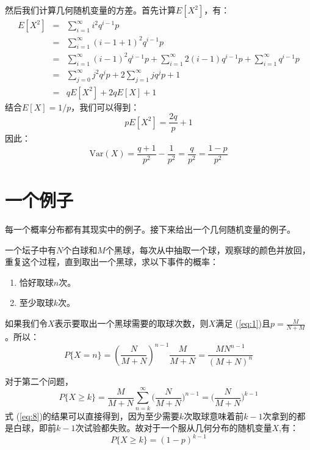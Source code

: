 \documentclass[10pt,a4paper,UTF8]{article}
\begin{document}
然后我们计算几何随机变量的方差。首先计算\(E[X^{2}]\)，有：
\begin{eqnarray}
\label{eq:4}
E[X^{2}]&=& \sum_{i=1}^{\infty} i^{2}q^{i-1}p \\
&=&\sum_{i=1}^{\infty} (i-1+1)^{2}q^{i-1}p \\
&=&\sum_{i=1}^{\infty} (i-1)^{2}q^{i-1}p + \sum_{i=1}^{\infty} 2(i-1)q^{i-1}p + \sum_{i=1}^{\infty}q^{i-1}p \\
&=&\sum_{j=0}^{\infty}j^{2}q^{j}p + 2\sum_{j=1}^{\infty}jq^{j}p + 1 \\
&=&qE[X^{2}] + 2qE[X] +1
\end{eqnarray}
结合\(E[X]=1/p\)，我们可以得到：
\begin{equation}
\label{eq:5}
pE[X^{2}] = \frac{2q}{p} + 1
\end{equation}
因此：
\begin{equation}
\label{eq:6}
\mathrm{Var}(X) = \frac{q+1}{p^{2}} - \frac{1}{p^{2}} = \frac{q}{p^{2}} = \frac{1-p}{p^{2}}
\end{equation}
\section{一个例子}
\label{sec:orgbc3b044}


每一个概率分布都有其现实中的例子。接下来给出一个几何随机变量的例子。

\begin{tikzproblem}
一个坛子中有\(N\)个白球和\(M\)个黑球，每次从中抽取一个球，观察球的颜色并放回，重复这个过程，直到取出一个黑球，求以下事件的概率：
\begin{enumerate}
\item 恰好取球\(n\)次。
\item 至少取球\(k\)次。
\end{enumerate}
\end{tikzproblem}

\begin{tikzanswer}
如果我们令\(X\)表示要取出一个黑球需要的取球次数，则\(X\)满足 (\ref{eq:1})且\(p=\frac{M}{N+M}\)。所以：
\begin{equation}
\label{eq:7}
P\{X=n\} = (\frac{N}{M+N})^{n-1}\frac{M}{M+N} = \frac{MN^{n-1}}{(M+N)^{n}}
\end{equation}

对于第二个问题，
\begin{equation}
\label{eq:8}
P\{X\geq k\} = \frac{M}{M+N}\sum_{n=k}^{\infty} \bigg( \frac{N}{M+N} \bigg)^{n-1} = \bigg( \frac{N}{M+N} \bigg)^{k-1}
\end{equation}
式 (\ref{eq:8})的结果可以直接得到，因为至少需要\(k\)次取球意味着前\(k-1\)次拿到的都是白球，即前\(k-1\)次试验都失败。故对于一个服从几何分布的随机变量\(X\),有：
\begin{equation}
\label{eq:9}
P\{X\geq k\} = (1-p)^{k-1}
\end{equation}
\end{tikzanswer}
\end{document}
